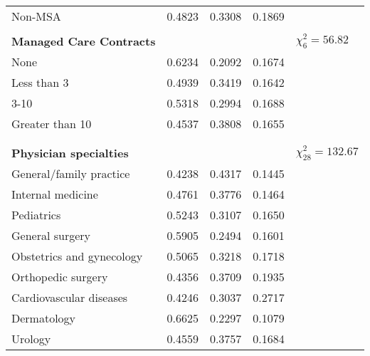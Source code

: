 \documentclass[11pt, oneside]{article}        %
\begin{document}
\begin{table}[h]
\begin{tabular}{@{}lllll@{}}
Non-MSA                                & 0.4823   & 0.3308     & 0.1869     &                        \\
                                       &          &            &            &                        \\
\textbf{Managed Care Contracts}        &          &            &            & $\chi^2_6 = 56.82$     \\
None                                   & 0.6234   & 0.2092     & 0.1674     &                        \\
Less than 3                            & 0.4939   & 0.3419     & 0.1642     &                        \\
3-10                                   & 0.5318   & 0.2994     & 0.1688     &                        \\
Greater than 10                        & 0.4537   & 0.3808     & 0.1655     &                        \\
                                       &          &            &            &                        \\
                                       &          &            &            &                        \\
\textbf{Physician specialties}         &          &            &            & $\chi^2_{28} = 132.67$ \\
General/family practice                & 0.4238   & 0.4317     & 0.1445     &                        \\
Internal medicine                      & 0.4761   & 0.3776     & 0.1464     &                        \\
Pediatrics                             & 0.5243   & 0.3107     & 0.1650     &                        \\
General surgery                        & 0.5905   & 0.2494     & 0.1601     &                        \\
Obstetrics and gynecology              & 0.5065   & 0.3218     & 0.1718     &                        \\
Orthopedic surgery                     & 0.4356   & 0.3709     & 0.1935     &                        \\
Cardiovascular diseases                & 0.4246   & 0.3037     & 0.2717     &                        \\
Dermatology                            & 0.6625   & 0.2297     & 0.1079     &                        \\
Urology                                & 0.4559   & 0.3757     & 0.1684     &                        \\

\end{tabular}
\end{table}
\end{document}
